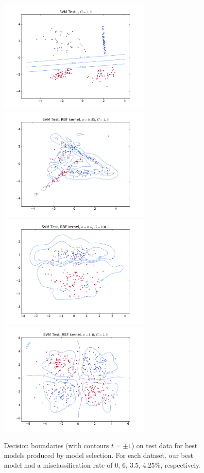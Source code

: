 \documentclass{article}
\begin{document}
\begin{multicols}{2}
\begin{figure}[t]
   \centering
   \includegraphics[width=3in]{img/p2-3-d1-c001/test.pdf}
   \includegraphics[width=3in]{img/p2-3-d2-c1-rbf025/test.pdf}
   \includegraphics[width=3in]{img/p2-3-d3-c100-rbf025/test.pdf}
   \includegraphics[width=3in]{img/p2-3-d4-c1-rbf10/test.pdf}
   \caption{Decision boundaries (with contours $t = \pm1$)
   on test data for best models produced by model selection.
   For each dataset, our best model had a misclassification rate of 0, 6, 3.5, 4.25\%, respectively.}
   \label{fig:2-3-model-selection}
\end{figure}


\end{multicols}
\end{document}
